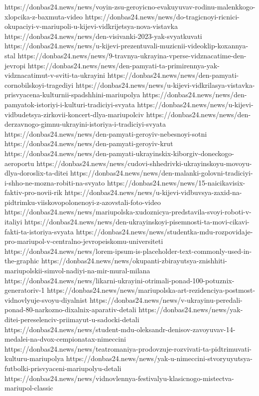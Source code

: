 https://donbas24.news/news/voyin-zsu-geroyicno-evakuyuvav-rodinu-malenkkogo-xlopcika-z-baxmuta-video
https://donbas24.news/news/do-tragicnoyi-ricnici-okupaciyi-v-mariupoli-u-kijevi-vidkrijetsya-nova-vistavka
https://donbas24.news/news/den-visivanki-2023-yak-svyatkuvati
https://donbas24.news/news/u-kijevi-prezentuvali-muzicnii-videoklip-koxannya-stal
https://donbas24.news/news/9-travnya-ukrayina-vperse-vidznacatime-den-jevropi
https://donbas24.news/news/den-pamyati-ta-primirennya-yak-vidznacatimut-v-sviti-ta-ukrayini
https://donbas24.news/news/den-pamyati-cornobilskoyi-tragediyi
https://donbas24.news/news/u-kijevi-vidkrilasya-vistavka-prisvyacena-kulturnii-spadshhini-mariupolya
https://donbas24.news/news/den-pamyatok-istoriyi-i-kulturi-tradiciyi-svyata
https://donbas24.news/news/u-kijevi-vidbudetsya-zirkovii-koncert-dlya-mariupolciv
https://donbas24.news/news/den-derzavnogo-gimnu-ukrayini-istoriya-i-tradiciyi-svyata
https://donbas24.news/news/den-pamyati-geroyiv-nebesnoyi-sotni
https://donbas24.news/news/den-pamyati-geroyiv-krut
https://donbas24.news/news/den-pamyati-ukrayinskix-kiborgiv-doneckogo-aeroportu
https://donbas24.news/news/cudovi-shhedrivki-ukrayinskoyu-movoyu-dlya-doroslix-ta-ditei
https://donbas24.news/news/den-malanki-golovni-tradiciyi-i-shho-ne-mozna-robiti-na-svyato
https://donbas24.news/news/15-naicikavisix-faktiv-pro-novii-rik
https://donbas24.news/news/u-kijevi-vidbuvsya-zaxid-na-pidtrimku-viiskovopolonenoyi-z-azovstali-foto-video
https://donbas24.news/news/mariupolska-xudoznicya-predstavila-svoyi-roboti-v-italiyi
https://donbas24.news/news/den-ukrayinskoyi-pisemnosti-ta-movi-cikavi-fakti-ta-istoriya-svyata
https://donbas24.news/news/studentka-mdu-rozpovidaje-pro-mariupol-v-centralno-jevropeiskomu-universiteti
https://donbas24.news/news/lorem-ipsum-is-placeholder-text-commonly-used-in-the-graphic
https://donbas24.news/news/okupanti-zbirayutsya-znishhiti-mariupolskii-simvol-nadiyi-na-mir-mural-milana
https://donbas24.news/news/likarni-ukrayini-otrimali-ponad-100-potuznix-generatoriv-1
https://donbas24.news/news/mariupolska-art-rezidenciya-postmost-vidnovlyuje-svoyu-diyalnist
https://donbas24.news/news/v-ukrayinu-peredali-ponad-80-narkozno-dixalnix-aparativ-detali
https://donbas24.news/news/yak-ditei-pereselenciv-priimayut-u-sadocki-detali
https://donbas24.news/news/student-mdu-oleksandr-denisov-zavoyuvav-14-medalei-na-dvox-cempionatax-nimeccini
https://donbas24.news/news/teatromaniya-prodovzuje-rozvivati-ta-pidtrimuvati-kulturu-mariupolya
https://donbas24.news/news/yak-u-nimeccini-stvoryuyutsya-futbolki-prisvyaceni-mariupolyu-detali
https://donbas24.news/news/vidnovlennya-festivalyu-klasicnogo-mistectva-mariupol-classic

